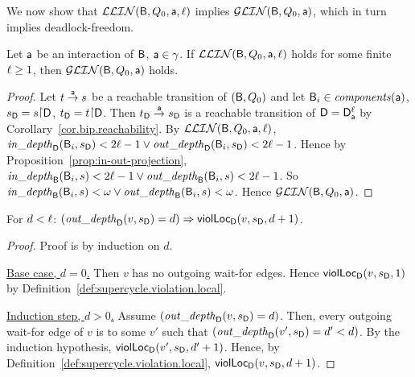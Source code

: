 \noindent
We now show that $\mathcal{LLIN}(\mathsf{B}, Q_0, \mathsf{a}, \ell)$ implies $\mathcal{GLIN}(\mathsf{B}, Q_0, \mathsf{a})$, which in turn implies deadlock-freedom.  

\begin{lemma}
\label{lemma:loc-implies-glob}
\label{lemma:locLinear-implies-globlinear}
\label{LLinGLin}
Let $\mathsf{a}$ be an interaction of $\mathsf{B}$, \ie $\mathsf{a} \in \gamma$.
If $\mathcal{LLIN}(\mathsf{B}, Q_0, \mathsf{a}, \ell)$ holds for some finite $\ell \ge 1$, then $\mathcal{GLIN}(\mathsf{B}, Q_0, \mathsf{a})$ holds.
\end{lemma}
%
\begin{proof}
Let $t \stackrel{\mathsf{a}}{\rightarrow} s$ be a reachable transition of $(\mathsf{B}, Q_0)$ and let 
$\mathsf{B}_i \in \mathit{components}(\mathsf{a})$, $\sD = s \pj \dsk{\act}{\l}$, $\tD = t \pj \dsk{\act}{\l}$.
Then $t_\mathsf{D} \stackrel{\mathsf{a}}{\rightarrow} s_\mathsf{D}$ is a reachable transition of $\mathsf{D} = \mathsf{D}_{\mathsf{a}}^{\ell}$ by Corollary~\ref{cor.bip.reachability}.
By $\mathcal{LLIN}(\mathsf{B}, Q_0, \mathsf{a}, \ell)$, 
$\mathit{in\_depth}_{\mathsf{D}}({\mathsf{B}_i, s_\mathsf{D}}) < 2\ell-1 \lor \mathit{out\_depth}_{\mathsf{D}}({\mathsf{B}_i, s_\mathsf{D}}) < 2\ell-1$.
Hence by Proposition~\ref{prop:in-out-projection},
$\mathit{in\_depth}_{\mathsf{B}}({\mathsf{B}_i, s}) < 2\ell-1 \lor \mathit{out\_depth}_{\mathsf{B}}({\mathsf{B}_i, s}) < 2\ell-1$.
So
$\mathit{in\_depth}_{\mathsf{B}}({\mathsf{B}_i, s}) < \omega \lor \mathit{out\_depth}_{\mathsf{B}}({\mathsf{B}_i, s}) < \omega$.
Hence $\mathcal{GLIN}(\mathsf{B}, Q_0, \mathsf{a})$.
\end{proof}








\begin{proposition}
\label{prop:finOutDepth-Implies-locScViol}
For $d < \ell$: $(\mathit{out\_depth}_{\mathsf{D}}({v, s_\mathsf{D}}) = d)  \Rightarrow \mathsf{violLoc}_{\mathsf{D}}(v,s_\mathsf{D},d+1)$.
\end{proposition}
%
\begin{proof}
Proof is by induction on $d$. 

\vspace{1.0ex}
\ul{Base case, $d=0$.}
Then $v$ has no outgoing wait-for edges. Hence $\mathsf{violLoc}_{\mathsf{D}}(v,s_\mathsf{D},1)$ by Definition~\ref{def:supercycle.violation.local}.

\vspace{1.0ex}
\ul{Induction step, $d > 0$.}
Assume $(\mathit{out\_depth}_{\mathsf{D}}({v, s_\mathsf{D}}) = d)$. Then, every outgoing wait-for edge of $v$ is to some $v'$ such that 
$(\mathit{out\_depth}_{\mathsf{D}}({v', s_\mathsf{D}}) = d' < d)$. By the induction hypothesis, $\mathsf{violLoc}_{\mathsf{D}}(v',s_\mathsf{D},d'+1)$.
Hence, by Definition~\ref{def:supercycle.violation.local},  $\mathsf{violLoc}_{\mathsf{D}}(v,s_\mathsf{D},d+1)$.
\end{proof}


